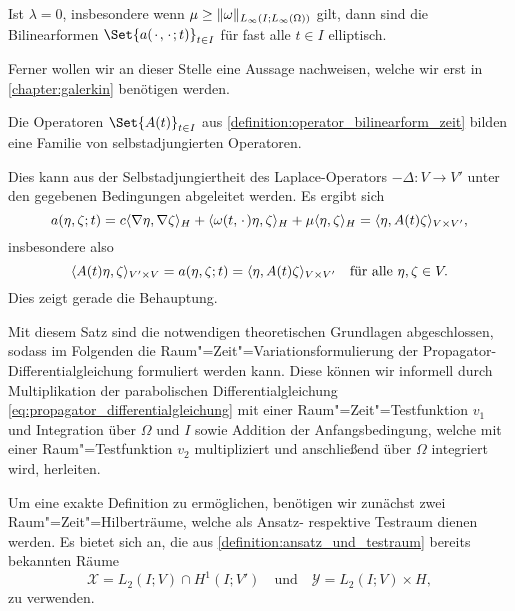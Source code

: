 \documentclass[../main.tex]{subfiles}
\begin{document}
\begin{Korollar}
\label{korollar:bilinearform_elliptisch}
    Ist $\lambda = 0$, insbesondere wenn $\mu \geq \norm{\omega}_{L_{\infty}(I; L_{\infty}(\Omega))}$ gilt, dann sind die Bilinearformen $\Set{a(\blank, \blank; t)}_{t \in I}$ für fast alle $t \in I$ elliptisch.
\end{Korollar}

Ferner wollen wir an dieser Stelle eine Aussage nachweisen, welche wir erst in \cref{chapter:galerkin} benötigen werden.

\begin{Lemma}
\label{lemma:operator_selbstadjungiert}
    Die Operatoren $\Set{A(t)}_{t \in I}$ aus \cref{definition:operator_bilinearform_zeit} bilden eine Familie von selbstadjungierten Operatoren.

    \begin{Beweis}
        Dies kann aus der Selbstadjungiertheit des Laplace-Operators $- \Delta \colon V \to V'$ unter den gegebenen Bedingungen abgeleitet werden.
        Es ergibt sich
        \begin{equation}
            a(\eta, \zeta; t)
            = c\skp{\grad \eta}{\grad \zeta}{H} + \skp{\omega(t, \blank) \eta}{\zeta}{H} + \mu \skp{\eta}{\zeta}{H}= \skp{\eta}{A(t) \zeta}{V \times V'},
        \end{equation}
        insbesondere also
        \begin{equation}
            \skp{A(t)\eta}{\zeta}{V' \times V} = a(\eta, \zeta; t) = \skp{\eta}{A(t) \zeta}{V \times V'} \quad \fa \eta, \zeta \in V.
        \end{equation}
        Dies zeigt gerade die Behauptung.
    \end{Beweis}
\end{Lemma}

Mit diesem Satz sind die notwendigen theoretischen Grundlagen abgeschlossen, sodass im Folgenden die Raum"=Zeit"=Variationsformulierung der Propagator-Differentialgleichung formuliert werden kann.
Diese können wir informell durch Multiplikation der parabolischen Differentialgleichung \cref{eq:propagator_differentialgleichung} mit einer Raum"=Zeit"=Testfunktion $v_{1}$ und Integration über $\Omega$ und $I$ sowie Addition der Anfangsbedingung, welche mit einer Raum"=Testfunktion $v_{2}$ multipliziert und anschließend über $\Omega$ integriert wird, herleiten.

Um eine exakte Definition zu ermöglichen, benötigen wir zunächst zwei Raum"=Zeit"=Hilberträume, welche als Ansatz- respektive Testraum dienen werden.
Es bietet sich an, die aus \cref{definition:ansatz_und_testraum} bereits bekannten Räume
\begin{equation}
    \label{eq:raum_zeit_ansatzraum_testraum}
    \mathcal X = L_{2}(I; V) \cap H^{1}(I; V')
    \quad \text{und} \quad
    \mathcal Y = L_{2}(I; V) \times H,
\end{equation}
zu verwenden.
\end{document}
